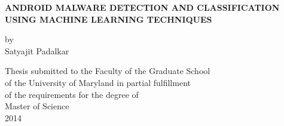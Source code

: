 \begin{titlepage}
\mbox{}\vspace{1in}
\begin{center}

    {\Large \bf ANDROID MALWARE DETECTION AND CLASSIFICATION USING MACHINE LEARNING TECHNIQUES \par}
    
\vspace{1.9in}

    {\large by} \\
    {\large Satyajit Padalkar }
    
\vspace{1.9in}

  \begin{singlespace}
    Thesis submitted to the Faculty of the Graduate School \\
    of the University of Maryland in partial fulfillment \\
    of the requirements for the degree of \\
    Master of Science \\
    2014
	\end{singlespace}
\end{center}
\end{titlepage}
